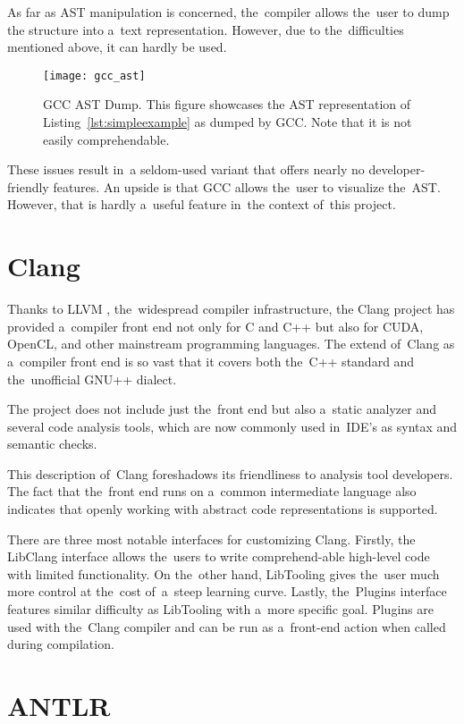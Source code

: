 As far as AST manipulation is concerned, the~compiler allows the~user to dump 
the structure into a~text representation. 
However, due to the~difficulties mentioned above, it can hardly be used.

\begin{figure}[p]\centering
\texttt{[image: gcc\_ast]}
\caption{GCC AST Dump. This figure showcases 
the AST representation of Listing~\ref{lst:simpleexample}
as dumped by GCC. Note that it is not easily comprehendable.}
\label{img:gcc}
\end{figure}

These issues result in~a seldom-used variant that offers nearly 
no developer-friendly features. 
An upside is that GCC allows the~user to visualize the~AST. 
However, that is hardly a~useful feature in~the context of~this project.

\section{Clang}

Thanks to LLVM \citep{llvm:online}, the~widespread compiler infrastructure,
the Clang project \citep{clang:online}
has provided a~compiler front end not only for C and C++ but also 
for CUDA, OpenCL, and other mainstream programming languages. 
The extend of~Clang as a~compiler front end is so vast that it covers 
both the~C++ standard and the~unofficial GNU++ dialect.

The project does not include just the~front end but also a~static analyzer 
and several code analysis tools, which are now commonly used in~IDE's as 
syntax and semantic checks. 

This description of~Clang foreshadows its friendliness to analysis tool developers. 
The fact that the~front end runs on a~common intermediate language also indicates 
that openly working with abstract code representations is supported.

There are three most notable interfaces for customizing Clang. 
Firstly, the LibClang interface allows the~users to write 
comprehend-able high-level code with limited functionality. 
On the~other hand, LibTooling gives the~user much more control 
at the~cost of~a~steep learning curve. 
Lastly, the~Plugins interface features similar difficulty 
as LibTooling with a~more specific goal. 
Plugins are used with the~Clang compiler and can be run 
as a~front-end action when called during compilation.

\section{ANTLR}

